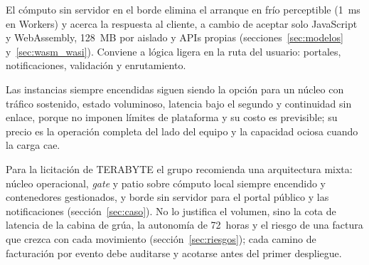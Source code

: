 \documentclass[12pt, letterpaper, table, xcdraw]{inf-pucv}
\begin{document}
El cómputo sin servidor en el borde elimina el arranque en frío perceptible (1~ms en Workers) y acerca la respuesta al cliente, a cambio de aceptar solo JavaScript y WebAssembly, 128~MB por aislado y APIs propias (secciones~\ref{sec:modelos} y~\ref{sec:wasm_wasi}). Conviene a lógica ligera en la ruta del usuario: portales, notificaciones, validación y enrutamiento.

Las instancias siempre encendidas siguen siendo la opción para un núcleo con tráfico sostenido, estado voluminoso, latencia bajo el segundo y continuidad sin enlace, porque no imponen límites de plataforma y su costo es previsible; su precio es la operación completa del lado del equipo y la capacidad ociosa cuando la carga cae.

Para la licitación de TERABYTE el grupo recomienda una arquitectura mixta: núcleo operacional, \emph{gate} y patio sobre cómputo local siempre encendido y contenedores gestionados, y borde sin servidor para el portal público y las notificaciones (sección~\ref{sec:caso}). No lo justifica el volumen, sino la cota de latencia de la cabina de grúa, la autonomía de 72~horas y el riesgo de una factura que crezca con cada movimiento (sección~\ref{sec:riesgos}); cada camino de facturación por evento debe auditarse y acotarse antes del primer despliegue.

\clearpage



{}
\printbibliography[title={Bibliografía}]

\clearpage
\end{document}
